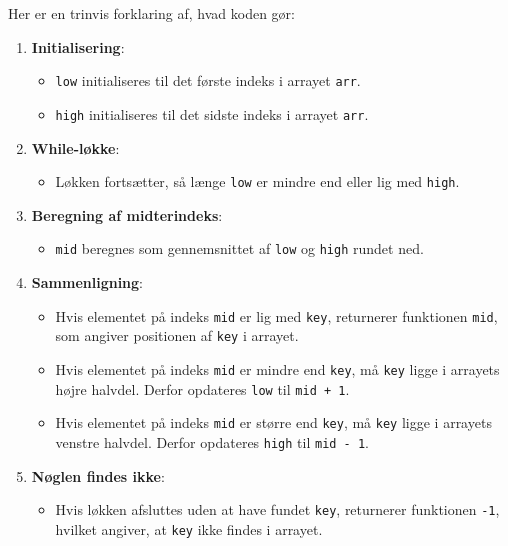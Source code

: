 Her er en trinvis forklaring af, hvad koden gør:

\begin{enumerate}
    \item \textbf{Initialisering}:
        \begin{itemize}
            \item \texttt{low} initialiseres til det første indeks i arrayet \texttt{arr}.
            \item \texttt{high} initialiseres til det sidste indeks i arrayet \texttt{arr}.
        \end{itemize}
    \item \textbf{While-løkke}:
        \begin{itemize}
            \item Løkken fortsætter, så længe \texttt{low} er mindre end eller lig med \texttt{high}.
        \end{itemize}
    \item \textbf{Beregning af midterindeks}:
        \begin{itemize}
            \item \texttt{mid} beregnes som gennemsnittet af \texttt{low} og \texttt{high} rundet ned.
        \end{itemize}
    \item \textbf{Sammenligning}:
        \begin{itemize}
            \item Hvis elementet på indeks \texttt{mid} er lig med \texttt{key}, returnerer funktionen \texttt{mid}, som angiver positionen af \texttt{key} i arrayet.
            \item Hvis elementet på indeks \texttt{mid} er mindre end \texttt{key}, må \texttt{key} ligge i arrayets højre halvdel. Derfor opdateres \texttt{low} til \texttt{mid + 1}.
            \item Hvis elementet på indeks \texttt{mid} er større end \texttt{key}, må \texttt{key} ligge i arrayets venstre halvdel. Derfor opdateres \texttt{high} til \texttt{mid - 1}.
        \end{itemize}
    \item \textbf{Nøglen findes ikke}:
        \begin{itemize}
            \item Hvis løkken afsluttes uden at have fundet \texttt{key}, returnerer funktionen \texttt{-1}, hvilket angiver, at \texttt{key} ikke findes i arrayet.
        \end{itemize}
\end{enumerate}

